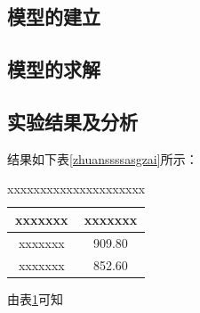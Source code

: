 \documentclass{whutmod}
\begin{document}
		\subsection{模型的建立}
		
		\subsection{模型的求解}

        \subsection{实验结果及分析}
        
			结果如下表\ref{zhuanssssasgzai}所示：
			\begin{table}[H]
			\centering		
			\caption{xxxxxxxxxxxxxxxxxxxxx}\label{biao1}
			\begin{tabular}{cc}
			\toprule[2pt]
				\multicolumn{1}{m{5cm}}{\centering xxxxxxx}
				& \multicolumn{1}{m{5cm}}{\centering xxxxxxx}
				\\
				\midrule[1pt]
				xxxxxxx &   909.80\\ 
				xxxxxxx & 	852.60\\ 
			\bottomrule[2pt]	
			\end{tabular}
			\end{table}
  
  			由表\ref{biao1}可知
\end{document}
